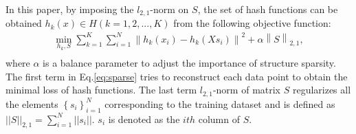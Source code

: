 \documentclass{sig-alternate}
\begin{document}
In this paper, by imposing the $l_{2,1}$-norm on $S$, the set of hash functions can be obtained $h_k(x)\in H(k=1,2,...,K)$ from the following objective function:
\begin{equation}
\begin{array}{l}
\mathop {\min }\limits_{{h_k},S} \sum\limits_{k = 1}^K {\sum\limits_{i = 1}^N {{{\left\| {{h_k}({x_i}) - {h_k}(X{s_i})} \right\|}^2}} }  + \alpha {\left\| S \right\|_{2,1}},\\
\end{array}
\label{eq:sparse}
\end{equation}
where $\alpha$ is a balance parameter to adjust the importance of structure sparsity. The first term in Eq.\ref{eq:sparse} tries to reconstruct each data point to obtain the minimal loss of hash functions. The last term $l_{2,1}$-norm of matrix $S$ regularizes all the elements $\left\{s_i\right\}_{i=1}^N$ corresponding to the training dataset and is defined as $||S||_{2,1}=\sum_{i=1}^{N}||s_{i}||$. $s_{i}$ is denoted as the $ith$ column of $S$.
\end{document}
